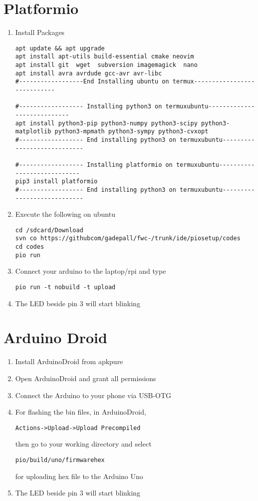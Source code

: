 \documentclass[journal,2pt,twocolumn]{IEEEtran}
\begin{document}
\section{Platformio }
\begin{enumerate}
	\item Install Packages
\begin{lstlisting}
apt update && apt upgrade
apt install apt-utils build-essential cmake neovim
apt install git  wget  subversion imagemagick  nano  
apt install avra avrdude gcc-avr avr-libc
#------------------End Installing ubuntu on termux----------------------------

#------------------ Installing python3 on termuxubuntu----------------------------
apt install python3-pip python3-numpy python3-scipy python3-matplotlib python3-mpmath python3-sympy python3-cvxopt
#------------------ End installing python3 on termuxubuntu----------------------------

#------------------ Installing platformio on termuxubuntu----------------------------
pip3 install platformio
#------------------ End installing python3 on termuxubuntu----------------------------
\end{lstlisting}
\item Execute the following on ubuntu
\begin{lstlisting}
cd /sdcard/Download
svn co https://githubcom/gadepall/fwc-/trunk/ide/piosetup/codes
cd codes
pio run
\end{lstlisting}
\item Connect your arduino to the  laptop/rpi and type
\begin{lstlisting}
pio run -t nobuild -t upload
\end{lstlisting}
\item The LED beside pin 3 will start
blinking

\end{enumerate}
\section{Arduino Droid}
\begin{enumerate}
\item Install ArduinoDroid from apkpure
\item Open ArduinoDroid and grant all permissions
\item Connect the Arduino to your phone via USB-OTG
\item For flashing the bin files, in ArduinoDroid,
\begin{lstlisting}
Actions->Upload->Upload Precompiled
\end{lstlisting}
then go to your working directory and select
\begin{lstlisting}
pio/build/uno/firmwarehex
\end{lstlisting}
for uploading hex file to the Arduino Uno
\item The LED beside pin 3 will start
blinking
\end{enumerate}


\end{document}
